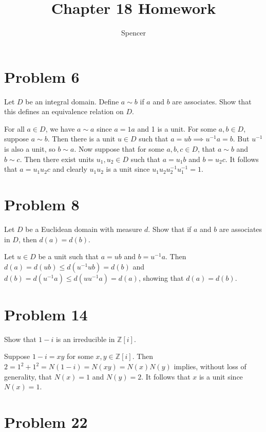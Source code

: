 \documentclass{article}
\title{Chapter 18 Homework}
\author{Spencer}
\begin{document}
\maketitle

\newcommand{\Z}{\mathbb{Z}}
\newcommand{\R}{\mathbb{R}}
\newcommand{\N}{\mathbb{N}}
\newcommand{\Q}{\mathbb{Q}}
\newcommand{\lcm}{\mbox{lcm}}

\section*{Problem 6}

Let $D$ be an integral domain.  Define $a\sim b$ if $a$ and $b$ are associates.
Show that this defines an equivalence relation on $D$.

For all $a\in D$, we have $a\sim a$ since $a=1a$ and 1 is a unit.
For some $a,b\in D$, suppose $a\sim b$.  Then there is a unit $u\in D$
such that $a=ub\implies u^{-1}a=b$.  But $u^{-1}$ is also a unit,
so $b\sim a$.  Now suppose that for some $a,b,c\in D$, that $a\sim b$ and $b\sim c$.
Then there exist units $u_1,u_2\in D$ such that $a=u_1b$ and $b=u_2c$.
It follows that $a=u_1u_2c$ and clearly $u_1u_2$ is a unit since $u_1u_2u_2^{-1}u_1^{-1}=1$.

\section*{Problem 8}

Let $D$ be a Euclidean domain with measure $d$.  Show that if $a$ and $b$ are
associates in $D$, then $d(a)=d(b)$.

Let $u\in D$ be a unit such that $a=ub$ and $b=u^{-1}a$.
Then $d(a)=d(ub)\leq d(u^{-1}ub)=d(b)$ and
$d(b)=d(u^{-1}a)\leq d(uu^{-1}a)=d(a)$, showing that $d(a)=d(b)$.

\section*{Problem 14}

Show that $1-i$ is an irreducible in $\Z[i]$.

Suppose $1-i=xy$ for some $x,y\in\Z[i]$.
Then $2=1^2+1^2=N(1-i)=N(xy)=N(x)N(y)$ implies, without loss of generality,
that $N(x)=1$ and $N(y)=2$.  It follows that $x$ is a unit since $N(x)=1$.

\pagebreak
\section*{Problem 22}
\end{document}
